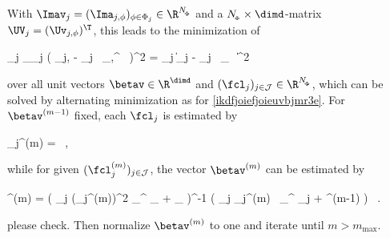With \( \Imav_{j} = (\Ima_{j,\sph})_{\sph \in \Sph_{j}} \in \R^{\nSph} \) and a \( \nSph \times \dimd \)-matrix 
\( \UV_{j} = (\Uv_{j,\sph})^{\T} \), this leads to the minimization of
\begin{EQA}[c]
	\sum_{j \in \JJJ} \sum_{\sph \in \Sph_{j}} \bigl( \Ima_{j,\sph} - \fcl_{j} \, \Uv_{\jm,\sph}^{\T} \, \betav \bigr)^{2} 
	=
	\sum_{j \in \JJJ} \bigl\| \Imav_{j} - \fcl_{j} \, \UV_{\jm} \, \betav \bigr\|^{2}
	\qquad
\label{ikdfjoiefjoieuAVE}
\end{EQA}
over all unit vectors \( \betav \in \R^{\dimd} \) and \( (\fcl_{j})_{j \in \JJJ} \in \R^{\nSph} \), 
which can be solved by alternating minimization as for \eqref{ikdfjoiefjoieuvbjmr3e}.
For \( \betav^{(m-1)} \) fixed, each \( \fcl_{j} \) is estimated by
\begin{EQA}[c]
	\fcl_{j}^{(m)}
	=
	\, ,
\end{EQA}
while for given \( (\fcl_{j}^{(m)})_{j \in \JJJ} \), the vector \( \betav^{(m)} \) can be estimated by
\begin{EQA}[c]
	\betav^{(m)}
	=
	\biggl( \sum_{j \in \JJJ} (\fcl_{j}^{(m)})^{2} \; \UV_{\jm}^{\T} \UV_{\jm} + \lambda \Id_{\dimp} \biggr)^{-1}
	\biggl( \sum_{j \in \JJJ} \fcl_{j}^{(m)} \, \UV_{\jm}^{\T} \Imav_{j} + \lambda \betav^{(m-1)} \biggr)
	\, .
\end{EQA}
{\color{blue} please check.}
Then normalize \( \betav^{(m)} \) to one and iterate until \( m > m_{\max} \).


